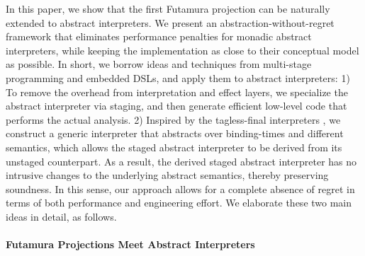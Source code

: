In this paper, we show that the first Futamura projection can be naturally
extended to abstract interpreters. We present an abstraction-without-regret
framework that eliminates performance penalties for monadic abstract
interpreters, while keeping the implementation as close to their conceptual
model as possible. In short, we borrow ideas and techniques from multi-stage
programming and embedded DSLs, and apply them to abstract interpreters:  1) To
remove the overhead from interpretation and effect layers, we specialize the
abstract interpreter via staging, and then generate efficient low-level code
that performs the actual analysis. 2) Inspired by the tagless-final interpreters
\cite{DBLP:journals/jfp/CaretteKS09}, we construct a generic interpreter that
abstracts over binding-times and different semantics, which allows the staged
abstract interpreter to be derived from its unstaged counterpart.  As a result,
the derived staged abstract interpreter has no intrusive changes to the
underlying abstract semantics, thereby preserving soundness.  In this sense, our
approach allows for a complete absence of regret in terms of both performance
and engineering effort. We elaborate these two main ideas in detail, as follows.




\paragraph{Futamura Projections Meet Abstract Interpreters}


